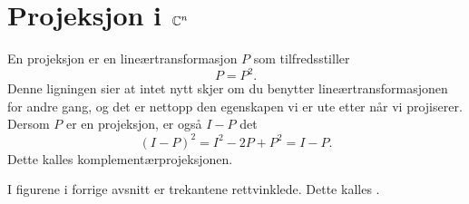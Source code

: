  



 \section*{Projeksjon i $\mathbb{C}^n$}
En projeksjon er en lineærtransformasjon $P$ som tilfredsstiller
\[
 P=P^2.
 \]
 Denne ligningen sier at intet nytt skjer om du benytter lineærtransformasjonen for andre gang, 
 og det er nettopp den egenskapen vi er ute etter når vi projiserer. 
 Dersom $P$ er en projeksjon, er også $I-P$ det
\[
 (I-P)^2=I^2-2P+P^2=I-P.
 \]
 Dette kalles komplementærprojeksjonen.
 
 I figurene i forrige avsnitt er trekantene rettvinklede. Dette kalles .
 
